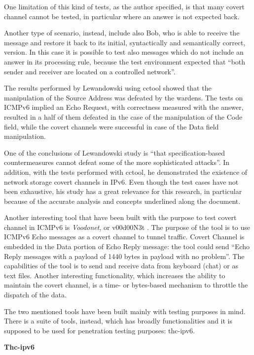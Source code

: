 \documentclass[12pt]{article}
\begin{document}
One limitation of this kind of tests, as the author specified, is that many covert channel cannot be tested, in particular where an answer is not expected back.

Another type of scenario, instead, include also Bob, who is able to receive the message and restore it back to its initial, syntactically and semantically correct, version. In this case it is possible to test also messages which do not include an answer in its processing rule, because the test environment expected that ``both sender and receiver are located on a controlled network''.

The results performed by Lewandowski using cctool showed that the manipulation of the Source Address was defeated by the wardens. The tests on ICMPv6 implied an Echo Request, with correctness measured with the answer, resulted in a half of them defeated in the case of the manipulation of the Code field, while the covert channels were successful in case of the Data field manipulation.

One of the conclusions of Lewandowski study is ``that specification-based countermeasures cannot defeat some of the more sophisticated attacks''. In addition, with the tests performed with cctool, he demonstrated the existence of network storage covert channels in IPv6. Even though the test cases have not been exhaustive, his study has a great relevance for this research, in particular because of the accurate analysis and concepts underlined along the document.

Another interesting tool that have been built with the purpose to test covert channel in ICMPv6 is \textit{Voodonet}, or v00d00N3t \cite{voodoo}. The purpose of the tool is to use ICMPv6 Echo messages as a covert channel to tunnel traffic. Covert Channel is embedded in the Data portion of Echo Reply message: the tool could send ``Echo Reply messages with a  payload of 1440 bytes in payload with no problem''. The capabilities of the tool is to send and receive data from keyboard (chat) or as text files. Another interesting functionality, which increases the ability to maintain the covert channel, is a time- or bytes-based mechanism to throttle the dispatch of the data.

The two mentioned tools have been built mainly with testing purposes in mind. There is a suite of tools, instead, which has broadly functionalities and it is supposed to be used for penetration testing purposes: thc-ipv6.

\textbf{Thc-ipv6}
\end{document}

